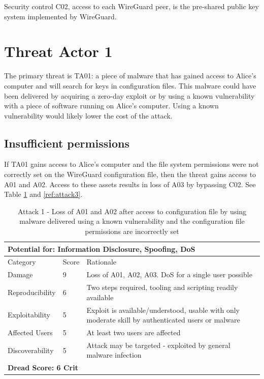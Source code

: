 \documentclass [11pt, proquest] {uwthesis}[2020/02/24]
\begin{document}
Security control C02, access to each WireGuard peer, is the pre-shared public key system implemented by WireGuard.

\section{Threat Actor 1}
The primary threat is TA01: a piece of malware that has gained access to Alice's computer and will search for keys in configuration files. This malware could have been delivered by acquiring a zero-day exploit or by using a known vulnerability with a piece of software running on Alice's computer. Using a known vulnerability would likely lower the cost of the attack.

\subsection{Insufficient permissions}
If TA01 gains access to Alice's computer and the file system permissions were not correctly set on the WireGuard configuration file, then the threat gains access to A01 and A02. Access to these assets results in loss of A03 by bypassing C02. 
See Table \ref{ref:attack1} and \ref{ref:attack3}.
\begin{table}[H]
\begin{tabular}{|m{3cm}|m{1cm}|p{27em} |}
\multicolumn{3}{l}{Potential for: Information Disclosure, Spoofing, DoS}                   \\
\hline
Category & Score & Rationale     \\
\hline
Damage          & 9     & Loss of A01, A02, A03. DoS for a single user possible            \\
\hline
Reproducibility & 6     & Two steps required, tooling and scripting readily available    \\
\hline
Exploitability & 5      & Exploit is available/understood, usable with only moderate skill by authenticated users or malware \\
\hline
Affected Users  & 5     & At least two users are affected                     \\
\hline
Discoverability & 5     & Attack may be targeted - exploited by general malware infection \\
\hline
\multicolumn{3}{l}{\textbf{Dread Score: 6 Crit}} 
\end{tabular}
\caption{Attack 1 - Loss of A01 and A02 after access to configuration file by using malware delivered using a known vulnerability and the configuration file permissions are incorrectly set}
\label{ref:attack1}
\end{table}
\end{document}

